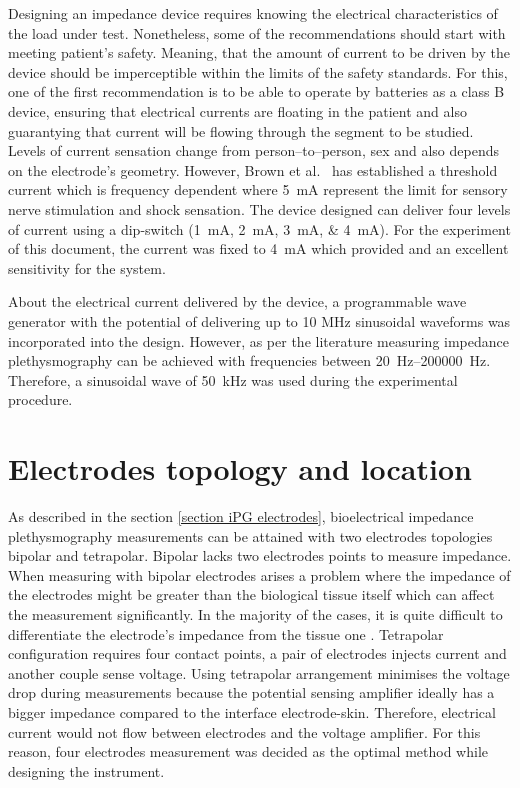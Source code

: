 Designing an impedance device requires knowing the electrical characteristics of the load under test. Nonetheless, some of the recommendations should start with meeting patient's safety. Meaning, that the amount of current to be driven by the device should be imperceptible within the limits of the safety standards. For this, one of the first recommendation is to be able to operate by batteries as a class B device, ensuring that electrical currents are floating in the patient and also guarantying that current will be flowing through the segment to be studied. Levels of current sensation change from person–to–person, sex and also depends on the electrode's geometry. However, Brown et al.~\cite{brown1998medical} has established a threshold current which is frequency dependent where \SI{5}{\mA} represent the limit for sensory nerve stimulation and shock sensation. The device designed can deliver four levels of current using a dip-switch (\SIlist{1;2;3;4}{\mA}). For the experiment of this document, the current was fixed to \SI{4}{\mA} which provided and an excellent sensitivity for the system. 

About the electrical current delivered by the device, a programmable wave generator with the potential of delivering up to 10 MHz sinusoidal waveforms was incorporated into the design. However, as per the literature measuring impedance plethysmography can be achieved with frequencies between \SIrange[scientific-notation = engineering]{20}{200000}{\hertz}. Therefore, a sinusoidal wave of \SI{50}{\kilo\hertz} was used during the experimental procedure.

\section{Electrodes topology and location}
\label{section design electrodes}
As described in the section \ref{section iPG electrodes}, bioelectrical impedance plethysmography measurements can be attained with two electrodes topologies bipolar and tetrapolar. Bipolar lacks two electrodes points to measure impedance. When measuring with bipolar electrodes arises a problem where the impedance of the electrodes might be greater than the biological tissue itself which can affect the measurement significantly. In the majority of the cases, it is quite difficult to differentiate the electrode's impedance from the tissue one \cite{brown2000bipolar}. Tetrapolar configuration requires four contact points, a pair of electrodes injects current and another couple sense voltage. Using tetrapolar arrangement minimises the voltage drop during measurements because the potential sensing amplifier ideally has a bigger impedance compared to the interface electrode-skin. Therefore, electrical current would not flow between electrodes and the voltage amplifier. For this reason, four electrodes measurement was decided as the optimal method while designing the instrument. 

